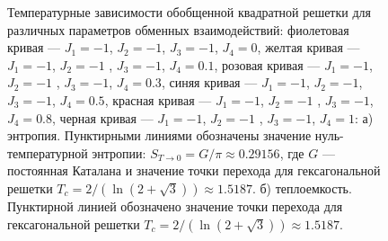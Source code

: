 \documentclass[utf8,12pt]{jetp}
\begin{document}
\begin{figure}[h]
	\begin{minipage}[h]{0.5\linewidth}
	\end{minipage}
	\hfill
	\begin{minipage}[h]{0.5\linewidth}
	\end{minipage}
	\caption{Температурные зависимости обобщенной квадратной решетки для различных параметров обменных взаимодействий: фиолетовая кривая --- $J_1 = -1$, $J_2 = -1$, $J_3 = -1$, $J_4 = 0$, желтая кривая --- $J_1 = -1$, $J_2 = -1$ , $J_3 = -1$, $J_4 = 0.1$, розовая кривая --- $J_1 = -1$, $J_2 = -1$ , $J_3 = -1$, $J_4 = 0.3$, синяя кривая --- $J_1 = -1$, $J_2 = -1$, $J_3 = -1$, $J_4 = 0.5$, красная кривая --- $J_1 = -1$, $J_2 = -1$ , $J_3 = -1$, $J_4 = 0.8$, черная кривая --- $J_1 = -1$, $J_2 = -1$ , $J_3 = -1$, $J_4 = 1$: а) энтропия. Пунктирными линиями обозначены значение нуль-температурной энтропии: $S_{T\rightarrow 0} = G/\pi\approx 0.29156$, где $G$ --- постоянная Каталана и значение точки перехода для гексагональной решетки $T_c = 2/(\ln(2+\sqrt{3}))\approx 1.5187$. б) теплоемкость. Пунктирной линией обозначено значение точки перехода для гексагональной решетки $T_c = 2/(\ln(2+\sqrt{3}))\approx 1.5187$. }
	\label{Peak2}
\end{figure}
\end{document}
